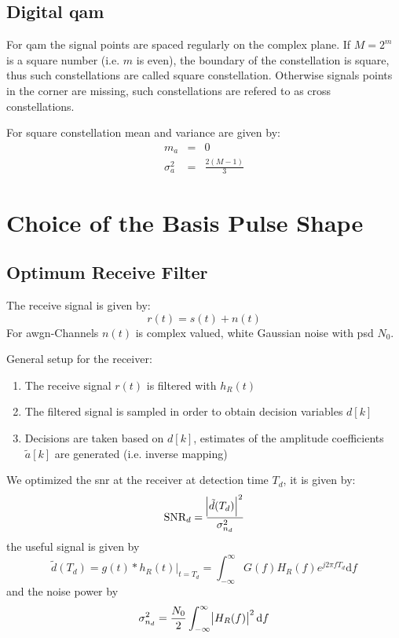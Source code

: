 \subsection{Digital \acl{qam}}
For \ac{qam} the signal points are spaced regularly on the complex plane.
If $M=2^m$ is a square number (i.e. $m$ is even), the boundary of the constellation
is square, thus such constellations are called square constellation. Otherwise
signals points in the corner are missing, such constellations are refered to as cross
constellations.

For square constellation mean and variance are given by:
\begin{eqnarray}
    m_a &=& 0 \\
    \sigma_a^2 &=& \frac{2 (M-1)}{3}
\end{eqnarray}

\section{Choice of the Basis Pulse Shape}
\subsection{Optimum Receive Filter}
The receive signal is given by:
\begin{equation}
    r(t) = s(t) + n(t)
\end{equation}
For \ac{awgn}-Channels $n(t)$ is complex valued, white Gaussian noise with \ac{psd} $N_0$.

General setup for the receiver:
\begin{enumerate}
    \item The receive signal $r(t)$ is filtered with $h_R(t)$
    \item The filtered signal is sampled in order to obtain decision variables $d[k]$
    \item Decisions are taken based on $d[k]$, estimates of the amplitude
        coefficients $\tilde{a}[k]$ are generated (i.e. inverse mapping)
\end{enumerate}

We optimized the \ac{snr} at the receiver at detection time $T_d$, it is given by:
\begin{equation}
    \text{SNR}_d = \frac{\abs{\tilde{d}(T_d)}^2}{\sigma_{n_d}^2}
\end{equation}
the useful signal is given by
\begin{equation}
    \tilde{d}(T_d) = g(t) * h_R(t) \vert_{t=T_d} = \int_{-\infty}^\infty G(f) H_R(f)
        e^{j 2 \pi f T_d} \text{d}f
\end{equation}
and the noise power by
\begin{equation}
    \sigma_{n_d}^2 = \frac{N_0}{2} \int_{-\infty}^\infty \abs{H_R(f)}^2 \text{d}f
\end{equation}

